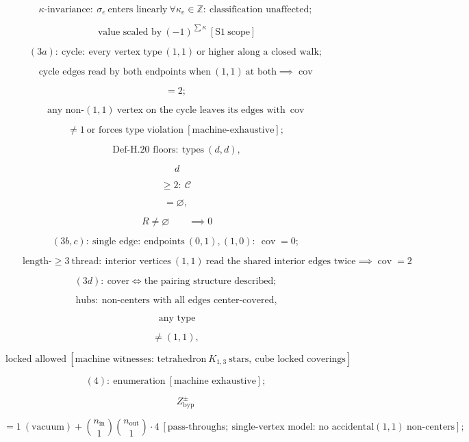 \begin{theorem}
\[
\kappa\text{-invariance}:\ \sigma_e\ \text{enters linearly}\ \forall\kappa_e\in\mathbb Z:\ \text{classification unaffected};
\]

\[
\ \text{value scaled by}\ (-1)^{\sum\kappa}\ [\mathrm{S1}\ \text{scope}]
\]

\[
(3a):\ \text{cycle}:\ \text{every vertex type}\ (1,1)\ \text{or higher along a closed walk};
\]

\[
\ \text{cycle edges read by both endpoints when}\ (1,1)\ \text{at both}\implies\operatorname{cov}
\]

\[
= 2;
\]

\[
\ \text{any non-}(1,1)\ \text{vertex on the cycle leaves its edges with}\ \operatorname{cov}
\]

\[
\ne 1\ \text{or forces type violation}\ [\text{machine-exhaustive}];
\]

\[
\ \text{Def-H.20 floors}:\ \text{types}\ (d,d),
\]

\[
\ d
\]

\[
\ge 2:\ \mathcal C
\]

\[
= \varnothing,
\]

\[
\ R\ne\varnothing\qquad \implies 0
\]

\[
(3b,c):\ \text{single edge}:\ \text{endpoints}\ (0,1),(1,0):\ \operatorname{cov}=0;
\]

\[
\qquad \text{length-}\ge3\ \text{thread}:\ \text{interior vertices}\ (1,1)\ \text{read the shared interior edges twice}\implies\operatorname{cov}=2
\]

\[
(3d):\ \text{cover}\iff\text{the pairing structure described};
\]

\[
\ \text{hubs}:\ \text{non-centers with all edges center-covered},
\]

\[
\ \text{any type}
\]

\[
\ne (1,1),
\]

\[
\ \text{locked allowed}\ [\text{machine witnesses: tetrahedron}\ K_{1,3}\ \text{stars},\ \text{cube locked coverings}]
\]

\[
(4):\ \text{enumeration}\ [\text{machine exhaustive}];
\]

\[
\qquad Z^{\pm}_{\mathrm{byp}}
\]

\[
= 1\ (\text{vacuum})+\binom{n_{\mathrm{in}}}1\binom{n_{\mathrm{out}}}1\cdot4\ [\text{pass-throughs};\ \text{single-vertex model: no accidental}(1,1)\ \text{non-centers}];
\]


\end{theorem}
